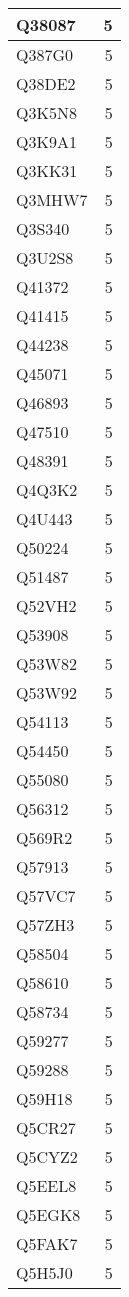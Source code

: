 \documentclass[
]{book}
\theoremstyle{definition}
\theoremstyle{definition}
\theoremstyle{definition}
\theoremstyle{definition}
\theoremstyle{remark}
\begin{document}
\begin{table}
\begin{tabular}{l|r}
\hline
Q38087 & 5\\
\hline
Q387G0 & 5\\
\hline
Q38DE2 & 5\\
\hline
Q3K5N8 & 5\\
\hline
Q3K9A1 & 5\\
\hline
Q3KK31 & 5\\
\hline
Q3MHW7 & 5\\
\hline
Q3S340 & 5\\
\hline
Q3U2S8 & 5\\
\hline
Q41372 & 5\\
\hline
Q41415 & 5\\
\hline
Q44238 & 5\\
\hline
Q45071 & 5\\
\hline
Q46893 & 5\\
\hline
Q47510 & 5\\
\hline
Q48391 & 5\\
\hline
Q4Q3K2 & 5\\
\hline
Q4U443 & 5\\
\hline
Q50224 & 5\\
\hline
Q51487 & 5\\
\hline
Q52VH2 & 5\\
\hline
Q53908 & 5\\
\hline
Q53W82 & 5\\
\hline
Q53W92 & 5\\
\hline
Q54113 & 5\\
\hline
Q54450 & 5\\
\hline
Q55080 & 5\\
\hline
Q56312 & 5\\
\hline
Q569R2 & 5\\
\hline
Q57913 & 5\\
\hline
Q57VC7 & 5\\
\hline
Q57ZH3 & 5\\
\hline
Q58504 & 5\\
\hline
Q58610 & 5\\
\hline
Q58734 & 5\\
\hline
Q59277 & 5\\
\hline
Q59288 & 5\\
\hline
Q59H18 & 5\\
\hline
Q5CR27 & 5\\
\hline
Q5CYZ2 & 5\\
\hline
Q5EEL8 & 5\\
\hline
Q5EGK8 & 5\\
\hline
Q5FAK7 & 5\\
\hline
Q5H5J0 & 5\\

\end{tabular}
\end{table}
\end{document}
